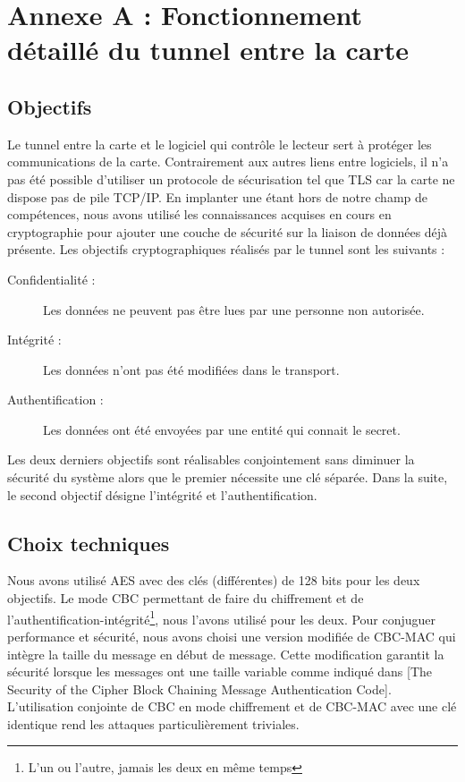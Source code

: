 \documentclass[a4paper,11pt,french]{article}
\begin{document}
\section{Annexe A : Fonctionnement détaillé du tunnel entre la carte}


\subsection{Objectifs}
Le tunnel entre la carte et le logiciel qui contr\^ole le lecteur sert à protéger les communications de la carte.
Contrairement aux autres liens entre logiciels, il n'a pas été possible d'utiliser un protocole de sécurisation tel que TLS 
car la carte ne dispose pas de pile TCP/IP. En implanter une étant hors de notre champ de compétences, nous avons utilisé 
les connaissances acquises en cours en cryptographie pour ajouter une couche de sécurité 
sur la liaison de données déjà présente. Les objectifs cryptographiques réalisés par le tunnel sont les suivants : 
\begin{description}
    \item[Confidentialité :] Les données ne peuvent pas être lues par une personne non autorisée.
    \item[Intégrité :] Les données n'ont pas été modifiées dans le transport.
    \item[Authentification :] Les données ont été envoyées par une entité qui connait le secret.
\end{description}
Les deux derniers objectifs sont réalisables conjointement sans diminuer la sécurité du système alors que le premier nécessite une clé séparée. Dans la suite, le second objectif désigne l'intégrité et l'authentification. 

\subsection{Choix techniques}

Nous avons utilisé AES avec des clés (différentes) de 128 bits pour les deux objectifs. 
Le mode CBC permettant de faire du chiffrement et de l'authentification-intégrité\footnote{L'un ou l'autre,
 jamais les deux en même temps}, nous l'avons utilisé pour les deux. 
Pour conjuguer performance et sécurité, nous avons choisi une version modifiée de CBC-MAC qui intègre la taille du message en début de message.
 Cette modification garantit la sécurité lorsque les messages ont une taille variable comme indiqué dans [The Security of the Cipher Block Chaining Message Authentication Code]. L'utilisation conjointe de CBC en mode chiffrement et de CBC-MAC avec une clé identique rend les attaques particulièrement triviales.
 
\end{document}
